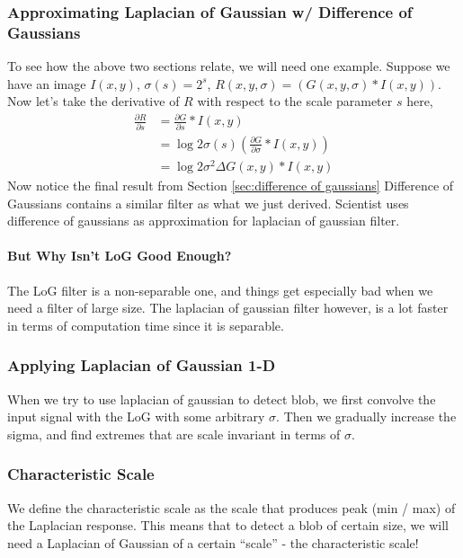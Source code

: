 \documentclass[11pt]{article}
\begin{document}
\subsubsection{Approximating Laplacian of Gaussian w/ Difference of Gaussians}
To see how the above two sections relate, we will need one example. Suppose we have an image $I(x,y)$, $\sigma(s) = 2^s$, $R(x,y,\sigma) = \left( G(x,y,\sigma) \ast I(x,y) \right)$. Now let's take the derivative of $R$ with respect to the scale parameter $s$ here, 
\begin{align}
	\frac{\partial R}{\partial s} 
	&= \frac{\partial G}{\partial s} \ast I(x,y) \\
	&= \log 2 \sigma(s) \left( \frac{\partial G}{\partial \sigma} \ast I(x,y)\right) \\
	&= \log 2 \sigma^2 \Delta G(x,y) \ast I(x,y)
\end{align}
Now notice the final result from Section \ref{sec:difference of gaussians} Difference of Gaussians contains a similar filter as what we just derived. Scientist uses difference of gaussians as approximation for laplacian of gaussian filter. 

\paragraph{But Why Isn't LoG Good Enough?} The LoG filter is a non-separable one, and things get especially bad when we need a filter of large size. The laplacian of gaussian filter however, is a lot faster in terms of computation time since it is separable. 

\subsubsection{Applying Laplacian of Gaussian 1-D}
When we try to use laplacian of gaussian to detect blob, we first convolve the input signal with the LoG with some arbitrary $\sigma$. Then we gradually increase the sigma, and find extremes that are scale invariant in terms of $\sigma$. 

\subsubsection{Characteristic Scale} We define the characteristic scale as the scale that produces peak (min / max) of the Laplacian response. This means that to detect a blob of certain size, we will need a Laplacian of Gaussian of a certain ``scale'' - the characteristic scale!
\end{document}
